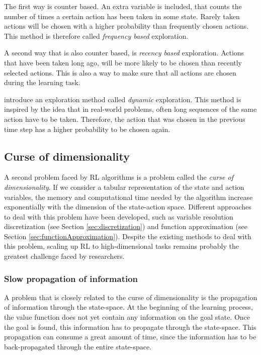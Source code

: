 \documentclass[a4paper,11pt]{mscLiterature}
\begin{document}
	The first way is counter based. An extra variable is included, that counts the number of times a certain action has been taken in some state. Rarely taken actions will be chosen with a higher probability than frequently chosen actions. This method is therefore called \emph{frequency based} exploration. 
	
	A second way that is also counter based, is \emph{recency based} exploration. Actions that have been taken long ago, will be more likely to be chosen than recently selected actions. This is also a way to make sure that all actions are chosen during the learning task.
	
	\cite{vanAstBabuska:06} introduce an exploration method called \emph{dynamic} exploration. This method is inspired by the idea that in real-world problems, often long sequences of the same action have to be taken. Therefore, the action that was chosen in the previous time step has a higher probability to be chosen again.
	
	\subsection{Curse of dimensionality}
	A second problem faced by RL algorithms is a problem called the \emph{curse of dimensionality}. If we consider a tabular representation of the state and action variables, the memory and computational time needed by the algorithm increase exponentially with the dimension of the state-action space. Different approaches to deal with this problem have been developed, such as variable resolution discretization (see Section \ref{sec:discretization}) and function approximation (see Section \ref{sec:functionApproximation}). Despite the existing methods to deal with this problem, scaling up RL to high-dimensional tasks remains probably the greatest challenge faced by researchers. 	

	\subsubsection{Slow propagation of information}
	A problem that is closely related to the curse of dimensionality is the propagation of information through the state-space. At the beginning of the learning process, the value function does not yet contain any information on the goal state. Once the goal is found, this information has to propagate through the state-space. This propagation can consume a great amount of time, since the information has to be back-propagated through the entire state-space. 
\end{document}
